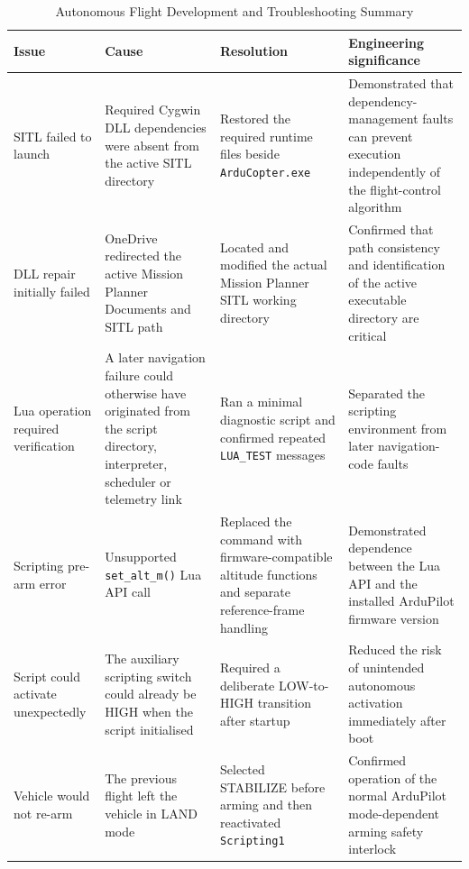 \documentclass[conference]{IEEEtran}
\begin{document}
\begin{table}[htbp]
\caption{Autonomous Flight Development and Troubleshooting Summary}
\label{tab:lua-troubleshooting}
\centering
\footnotesize
\renewcommand{\arraystretch}{1.15}
\begin{tabularx}{\textwidth}
{@{}
p{}
p{}
p{}
X
@{}}
\toprule
\textbf{Issue} &
\textbf{Cause} &
\textbf{Resolution} &
\textbf{Engineering significance} \\
\midrule

SITL failed to launch &
Required Cygwin DLL dependencies were absent from the active SITL directory &
Restored the required runtime files beside \texttt{ArduCopter.exe} &
Demonstrated that dependency-management faults can prevent execution
independently of the flight-control algorithm \\

DLL repair initially failed &
OneDrive redirected the active Mission Planner Documents and SITL path &
Located and modified the actual Mission Planner SITL working directory &
Confirmed that path consistency and identification of the active executable
directory are critical \\

Lua operation required verification &
A later navigation failure could otherwise have originated from the script
directory, interpreter, scheduler or telemetry link &
Ran a minimal diagnostic script and confirmed repeated
\texttt{LUA\_TEST} messages &
Separated the scripting environment from later navigation-code faults \\

Scripting pre-arm error &
Unsupported \texttt{set\_alt\_m()} Lua API call &
Replaced the command with firmware-compatible altitude functions and separate
reference-frame handling &
Demonstrated dependence between the Lua API and the installed ArduPilot
firmware version \\

Script could activate unexpectedly &
The auxiliary scripting switch could already be HIGH when the script
initialised &
Required a deliberate LOW-to-HIGH transition after startup &
Reduced the risk of unintended autonomous activation immediately after boot \\

Vehicle would not re-arm &
The previous flight left the vehicle in LAND mode &
Selected STABILIZE before arming and then reactivated
\texttt{Scripting1} &
Confirmed operation of the normal ArduPilot mode-dependent arming safety
interlock \\


\end{tabularx}
\end{table}
\end{document}
